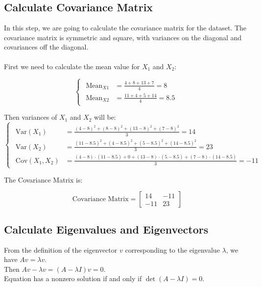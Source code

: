 \documentclass{article}
\begin{document}
\bigskip
\bigskip

\subsection{Calculate Covariance Matrix}

In this step, we are going to calculate the covariance matrix for the dataset. The covariance matrix is symmetric and square, with variances on the diagonal and covariances off the diagonal.\\\\
First we need to calculate the mean value for $X_1$ and $X_2$:

\[
\begin{cases}
  \begin{aligned}
    \text{Mean}_{X1} &= \frac{4 + 8 + 13 + 7}{4} = 8 \\
    \text{Mean}_{X2} &= \frac{11 + 4 + 5 + 14}{4} = 8.5
  \end{aligned}
\end{cases}
\]

\bigskip
\bigskip

Then variances of $X_1$ and $X_2$ will be:
\[
\begin{cases}
  \begin{aligned}
    \text{Var}(X_1) &= \frac{(4 - 8)^2 + (8 - 8)^2 + (13 - 8)^2 + (7 - 8)^2}{3} = 14 \\
    \text{Var}(X_2) &= \frac{(11 - 8.5)^2 + (4 - 8.5)^2 + (5 - 8.5)^2 + (14 - 8.5)^2}{3} = 23 \\
    \text{Cov}(X_1, X_2) &= \frac{(4 - 8) \cdot (11 - 8.5) + 0 + (13 - 8) \cdot (5 - 8.5) + (7 - 8) \cdot (14 - 8.5)}{3} = -11
  \end{aligned}
\end{cases}
\]

\bigskip
\bigskip

The Covariance Matrix is:

\[
\text{Covariance Matrix} =
\begin{bmatrix}
    14 & -11 \\
    -11 & 23
\end{bmatrix}
\]

\pagebreak

\subsection{Calculate Eigenvalues and Eigenvectors}
From the definition of the eigenvector \(v\) corresponding to the eigenvalue \(\lambda\), we have \(Av = \lambda v\). \\
Then \(Av - \lambda v = (A - \lambda I)v = 0\). \\
Equation has a nonzero solution if and only if \(\det(A - \lambda I) = 0\).
\end{document}

